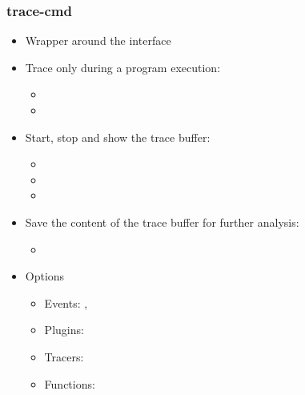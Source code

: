 \begin{frame}
        \frametitle{trace-cmd}
        \begin{itemize}
                \item Wrapper around the  interface
                \item Trace only during a program execution:
                        \begin{itemize}
                                \item {}
                                \item {}
                        \end{itemize}
                \item Start, stop and show the trace buffer:
                        \begin{itemize}
                                \item {}
                                \item {}
                                \item {}
                        \end{itemize}
                \item Save the content of the trace buffer for further analysis:
                        \begin{itemize}
                                \item {}
                        \end{itemize}
                \item Options
                        \begin{itemize}
                                \item Events: , 
                                \item Plugins: 
                                \item Tracers: 
                                \item Functions: 
                        \end{itemize}
        \end{itemize}
\end{frame}

